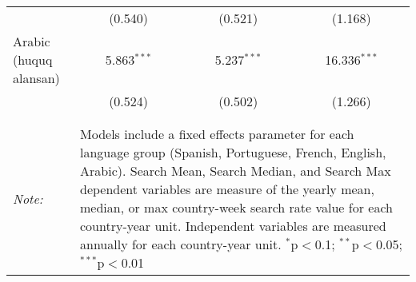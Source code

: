 \begin{table}[!htbp]
\begin{tabular}{@{\extracolsep{5pt}}lccc}
  & (0.540) & (0.521) & (1.168) \\ 
  Arabic (huquq alansan) & 5.863$^{***}$ & 5.237$^{***}$ & 16.336$^{***}$ \\ 
  & (0.524) & (0.502) & (1.266) \\ 
 \hline \\[-1.8ex] 
\hline 
\hline \\[-1.8ex] 
\textit{Note:}  & \multicolumn{3}{l}{\parbox[t]{8cm}{Models include a fixed effects parameter for each language group (Spanish, Portuguese, French, English, Arabic). Search Mean, Search Median, and Search Max dependent variables are measure of the yearly mean, median, or max country-week search rate value for each country-year unit. Independent variables are measured annually for each country-year unit. $^{*}$p$<$0.1; $^{**}$p$<$0.05; $^{***}$p$<$0.01}} \\ 
\end{tabular} 
\end{table} 

